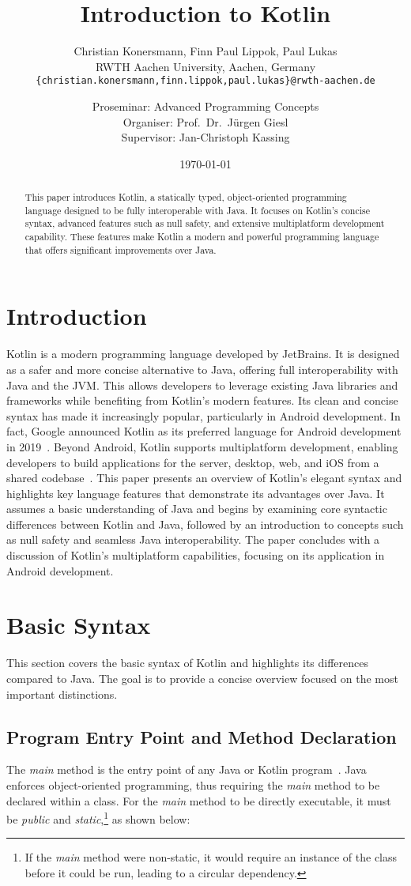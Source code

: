 \documentclass[a4paper,11pt]{article}
\title{\vspace{-0cm}\huge \bfseries Introduction to Kotlin}
\author{
  Christian Konersmann, Finn Paul Lippok, Paul Lukas\\[1ex]
  RWTH Aachen University, Aachen, Germany\\
  \texttt{\{christian.konersmann,finn.lippok,paul.lukas\}@rwth-aachen.de}\\
  \and
  Proseminar: Advanced Programming Concepts\\
  Organiser: Prof.\ Dr.\ Jürgen Giesl\\
  Supervisor: Jan-Christoph Kassing
}
\date{\today}
\begin{document}
\maketitle

\begin{abstract}
This paper introduces Kotlin, a statically typed, object-oriented programming language designed to be fully interoperable with Java. It focuses on Kotlin's concise syntax, advanced features such as null safety, and extensive multiplatform development capability. These features make Kotlin a modern and powerful programming language that offers significant improvements over Java.
\end{abstract}

\section{Introduction}
Kotlin is a modern programming language developed by JetBrains. It is designed as a safer and more concise alternative to Java, offering full interoperability with Java and the JVM. This allows developers to leverage existing Java libraries and frameworks while benefiting from Kotlin's modern features. Its clean and concise syntax has made it increasingly popular, particularly in Android development. In fact, Google announced Kotlin as its preferred language for Android development in 2019~\cite{intro-google}. Beyond Android, Kotlin supports multiplatform development, enabling developers to build applications for the server, desktop, web, and iOS from a shared codebase~\cite{intro-multiplatform-dev}. 
This paper presents an overview of Kotlin's elegant syntax and highlights key language features that demonstrate its advantages over Java. It assumes a basic understanding of Java and begins by examining core syntactic differences between Kotlin and Java, followed by an introduction to concepts such as null safety and seamless Java interoperability. The paper concludes with a discussion of Kotlin's multiplatform capabilities, focusing on its application in Android development.

\section{Basic Syntax}
This section covers the basic syntax of Kotlin and highlights its differences compared to Java. The goal is to provide a concise overview focused on the most important distinctions.

\subsection{Program Entry Point and Method Declaration}\label{sec:program-entry-point}
The \textit{main} method is the entry point of any Java or Kotlin program~\cite{program-entry-point}. Java enforces object-oriented programming, thus requiring the \textit{main} method to be declared within a class. For the \textit{main} method to be directly executable, it must be \textit{public} and \textit{static},\footnote{If the \textit{main} method were non-static, it would require an instance of the class before it could be run, leading to a circular dependency.} as shown below:
\end{document}
